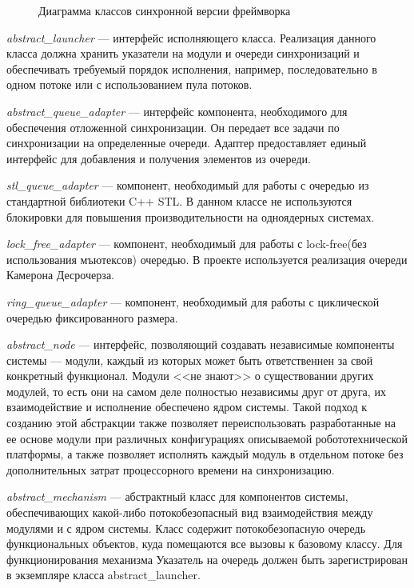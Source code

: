 \begin{figure}[h]
    \caption{Диаграмма классов синхронной версии фреймворка}
    \label{im:2_2_1_sync}
\end{figure}

\textit{abstract\_launcher} --- интерфейс исполняющего класса. Реализация данного класса должна хранить указатели на модули и очереди синхронизаций и обеспечивать требуемый порядок исполнения, например, последовательно в одном потоке или с использованием пула потоков.

\textit{abstract\_queue\_adapter} --- интерфейс компонента, необходимого для 
обеспечения отложенной синхронизации. Он передает все задачи по синхронизации 
на определенные очереди. Адаптер предоставляет единый интерфейс для добавления 
и получения элементов из очереди.

\textit{stl\_queue\_adapter} --- компонент, необходимый для работы с очередью из стандартной библиотеки C++ STL. В данном классе не используются блокировки для повышения производительности на одноядерных системах.

\textit{lock\_free\_adapter} --- компонент, необходимый для работы с lock-free(без использования мъютексов) очередью. В проекте используется реализация очереди Камерона Десрочерза.

\textit{ring\_queue\_adapter} --- компонент, необходимый для работы с  циклической очередью фиксированного размера.

\textit{abstract\_node} --- интерфейс, позволяющий создавать независимые 
компоненты системы --- модули, каждый из которых может быть ответственнен за 
свой конкретный функционал. Модули <<не знают>> о существовании других модулей, 
то есть они на самом деле полностью независимы друг от друга, их 
взаимодействие и исполнение обеспечено ядром системы. Такой подход к созданию 
этой абстракции также позволяет переиспользовать разработанные на ее основе 
модули при различных конфигурациях описываемой робототехнической платформы, а 
также позволяет исполнять каждый модуль в отдельном потоке без дополнительных 
затрат процессорного времени на синхронизацию. 

\textit{abstract\_mechanism} --- абстрактный класс для компонентов системы, обеспечивающих какой-либо потокобезопасный вид взаимодействия между модулями и с ядром системы. Класс содержит потокобезопасную очередь функциональных объектов, куда помещаются все вызовы к базовому классу. Для функционирования механизма Указатель на очередь должен быть зарегистрирован в экземпляре класса abstract\_launcher.

